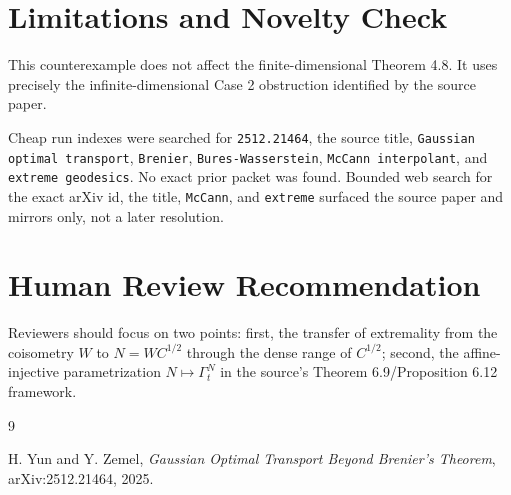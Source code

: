 \documentclass[11pt]{article}
\begin{document}
\section*{Limitations and Novelty Check}

This counterexample does not affect the finite-dimensional Theorem 4.8.  It
uses precisely the infinite-dimensional Case 2 obstruction identified by the
source paper.

Cheap run indexes were searched for \texttt{2512.21464}, the source title,
\texttt{Gaussian optimal transport}, \texttt{Brenier},
\texttt{Bures-Wasserstein}, \texttt{McCann interpolant}, and
\texttt{extreme geodesics}.  No exact prior packet was found.  Bounded web
search for the exact arXiv id, the title, \texttt{McCann}, and
\texttt{extreme} surfaced the source paper and mirrors only, not a later
resolution.

\section*{Human Review Recommendation}

Reviewers should focus on two points: first, the transfer of extremality from
the coisometry \(W\) to \(N=WC^{1/2}\) through the dense range of \(C^{1/2}\);
second, the affine-injective parametrization \(N\mapsto \Gamma_t^N\) in the
source's Theorem 6.9/Proposition 6.12 framework.

\begin{thebibliography}{9}

H. Yun and Y. Zemel,
\emph{Gaussian Optimal Transport Beyond Brenier's Theorem},
arXiv:2512.21464, 2025.

\end{thebibliography}
\end{document}
